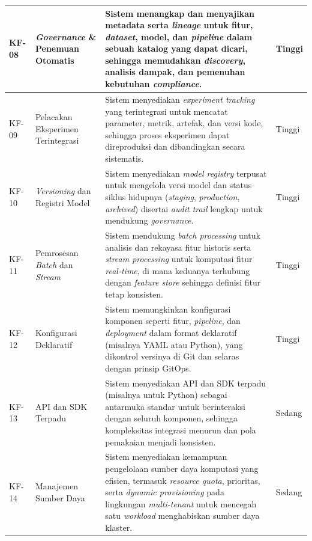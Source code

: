 {\begin{longtable}{|>{\centering\arraybackslash}m{0.75cm}|m{2cm}|m{8cm}|>{\centering\arraybackslash}m{1.75cm}|}
\hline
KF-08 & \textit{Governance} \& Penemuan Otomatis & Sistem menangkap dan menyajikan metadata serta \textit{lineage} untuk fitur, \textit{dataset}, model, dan \textit{pipeline} dalam sebuah katalog yang dapat dicari, sehingga memudahkan \textit{discovery}, analisis dampak, dan pemenuhan kebutuhan \textit{compliance}. & Tinggi \\
\hline
KF-09 & Pelacakan Eksperimen Terintegrasi & Sistem menyediakan \textit{experiment tracking} yang terintegrasi untuk mencatat parameter, metrik, artefak, dan versi kode, sehingga proses eksperimen dapat direproduksi dan dibandingkan secara sistematis. & Tinggi \\
\hline
KF-10 & \textit{Versioning} dan Registri Model & Sistem menyediakan \textit{model registry} terpusat untuk mengelola versi model dan status siklus hidupnya (\textit{staging}, \textit{production}, \textit{archived}) disertai \textit{audit trail} lengkap untuk mendukung \textit{governance}. & Tinggi \\
\hline
KF-11 & Pemrosesan \textit{Batch} dan \textit{Stream} & Sistem mendukung \textit{batch processing} untuk analisis dan rekayasa fitur historis serta \textit{stream processing} untuk komputasi fitur \textit{real-time}, di mana keduanya terhubung dengan \textit{feature store} sehingga definisi fitur tetap konsisten. & Tinggi \\
\hline
KF-12 & Konfigurasi Deklaratif & Sistem memungkinkan konfigurasi komponen seperti fitur, \textit{pipeline}, dan \textit{deployment} dalam format deklaratif (misalnya YAML atau Python), yang dikontrol versinya di Git dan selaras dengan prinsip GitOps. & Tinggi \\
\hline
KF-13 & API dan SDK Terpadu & Sistem menyediakan API dan SDK terpadu (misalnya untuk Python) sebagai antarmuka standar untuk berinteraksi dengan seluruh komponen, sehingga kompleksitas integrasi menurun dan pola pemakaian menjadi konsisten. & Sedang \\
\hline
KF-14 & Manajemen Sumber Daya & Sistem menyediakan kemampuan pengelolaan sumber daya komputasi yang efisien, termasuk \textit{resource quota}, prioritas, serta \textit{dynamic provisioning} pada lingkungan \textit{multi-tenant} untuk mencegah satu \textit{workload} menghabiskan sumber daya klaster. & Sedang \\
\hline
\end{longtable}
}